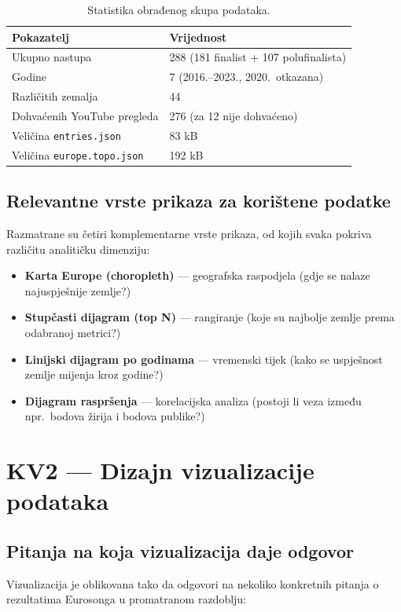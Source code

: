 \documentclass[a4paper,11pt]{article}
\newcommand{\kv}[2]{\clearpage\section{KV#1 --- #2}}
\begin{document}
\begin{table}[H]
\centering
\small
\begin{tabular}{ll}
\toprule
\textbf{Pokazatelj} & \textbf{Vrijednost} \\
\midrule
Ukupno nastupa & 288 (181 finalist + 107 polufinalista) \\
Godine & 7 (2016.–2023., 2020.\ otkazana) \\
Različitih zemalja & 44 \\
Dohvaćenih YouTube pregleda & 276 (za 12 nije dohvaćeno) \\
Veličina \texttt{entries.json} & 83 kB \\
Veličina \texttt{europe.topo.json} & 192 kB \\
\bottomrule
\end{tabular}
\caption{Statistika obrađenog skupa podataka.}
\end{table}

\subsection{Relevantne vrste prikaza za korištene podatke}

Razmatrane su četiri komplementarne vrste prikaza, od kojih svaka pokriva različitu analitičku dimenziju:

\begin{itemize}
  \item \textbf{Karta Europe (choropleth)} --- geografska raspodjela (gdje se nalaze najuspješnije zemlje?)
  \item \textbf{Stupčasti dijagram (top N)} --- rangiranje (koje su najbolje zemlje prema odabranoj metrici?)
  \item \textbf{Linijski dijagram po godinama} --- vremenski tijek (kako se uspješnost zemlje mijenja kroz godine?)
  \item \textbf{Dijagram raspršenja} --- korelacijska analiza (postoji li veza između npr.\ bodova žirija i bodova publike?)
\end{itemize}

\kv{2}{Dizajn vizualizacije podataka}

\subsection{Pitanja na koja vizualizacija daje odgovor}

Vizualizacija je oblikovana tako da odgovori na nekoliko konkretnih pitanja o rezultatima Eurosonga u promatranom razdoblju:
\end{document}
